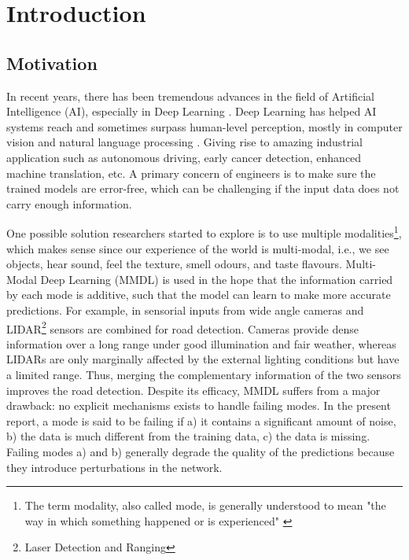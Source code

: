 
\chapter{Introduction} 
\label{chapter-introduction} 


\section{Motivation}

In recent years, there has been tremendous advances in the field of Artificial Intelligence (AI), especially in Deep Learning \citep{lecun-dl, deeplearning-overview}. Deep Learning has helped AI systems reach and sometimes surpass human-level perception, mostly in computer vision \citep{image-recognition} and natural language processing \citep{machine-translation}. Giving rise to amazing industrial application such as autonomous driving, early cancer detection, enhanced machine translation, etc. A primary concern of engineers is to make sure the trained models are error-free, which can be challenging if the input data does not carry enough information.

One possible solution researchers started to explore is to use multiple modalities\footnote{The term modality, also called mode, is generally understood to mean "the way in which something happened or is experienced" \citep{taxomany-multimodal}}, which makes sense since our experience of the world is multi-modal, i.e., we see objects, hear sound, feel the texture, smell odours, and taste flavours. Multi-Modal Deep Learning (MMDL) is used in the hope that the information carried by each mode is additive, such that the model can learn to make more accurate predictions. For example, in \citep{lidar-camera} sensorial inputs from wide angle cameras and LIDAR\footnote{Laser Detection and Ranging} sensors are combined for road detection. Cameras provide dense information over a long range under good illumination and fair weather, whereas LIDARs are only marginally affected by the external lighting conditions but have a limited range. Thus, merging the complementary information of the two sensors improves the road detection. Despite its efficacy, MMDL suffers from a major drawback: no explicit mechanisms exists to handle failing modes. In the present report, a mode is said to be failing if a) it contains a significant amount of noise, b) the data is much different from the training data, c) the data is missing. Failing modes a) and b) generally degrade the quality of the predictions because they introduce perturbations in the network.

